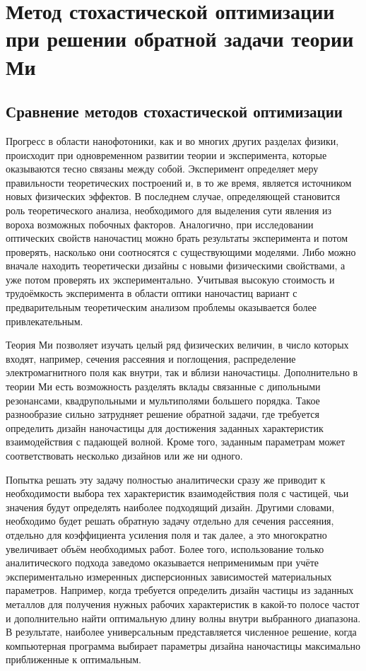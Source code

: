 \chapter{Метод стохастической оптимизации при решении обратной задачи
  теории Ми} \label{chapt2}

\section{Сравнение методов стохастической оптимизации}
\label{sec:construct-review}

Прогресс в области нанофотоники, как и во многих других разделах физики, происходит
при одновременном развитии теории и эксперимента, которые оказываются
тесно связаны между собой.  Эксперимент определяет меру правильности
теоретических построений и, в то же время, является источником новых
физических эффектов. В последнем случае, определяющей становится роль
теоретического анализа, необходимого для выделения сути явления из
вороха возможных побочных факторов.  Аналогично, при исследовании
оптических свойств наночастиц можно брать результаты эксперимента и
потом проверять, насколько они соотносятся с существующими моделями. Либо можно вначале  находить теоретически дизайны с новыми физическими свойствами,
а уже потом проверять их экспериментально.  Учитывая высокую стоимость
и трудоёмкость эксперимента в области оптики наночастиц вариант с
предварительным теоретическим анализом проблемы оказывается более
привлекательным.

Теория Ми позволяет изучать целый ряд физических величин, в число
которых входят, например, сечения рассеяния и поглощения,
распределение электромагнитного поля как внутри, так и вблизи
наночастицы.  Дополнительно в теории Ми есть возможность разделять
вклады связанные с дипольными резонансами, квадрупольными и
мультиполями большего порядка. Такое разнообразие сильно затрудняет
решение обратной задачи, где требуется определить дизайн наночастицы
для достижения заданных характеристик взаимодействия с падающей
волной. Кроме того, заданным параметрам может соответствовать
несколько дизайнов или же ни одного.

Попытка решать эту задачу полностью аналитически сразу же приводит к
необходимости выбора тех характеристик взаимодействия поля с частицей,
чьи значения будут определять наиболее подходящий дизайн. Другими
словами, необходимо будет решать обратную задачу отдельно для сечения
рассеяния, отдельно для коэффициента усиления поля и так далее, а это
многократно увеличивает объём необходимых работ. Более того,
использование только аналитического подхода заведомо оказывается
неприменимым при учёте экспериментально измеренных дисперсионных
зависимостей материальных параметров. Например, когда требуется
определить дизайн частицы из заданных металлов для получения нужных
рабочих характеристик в какой-то полосе частот и дополнительно
найти оптимальную длину волны внутри выбранного диапазона.  В
результате, наиболее универсальным представляется численное решение,
когда компьютерная программа выбирает параметры дизайна наночастицы
максимально приближенные к оптимальным.

